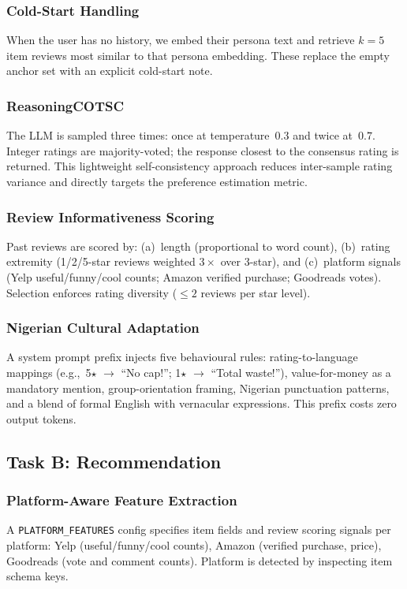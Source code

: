 \documentclass[11pt]{article}
\begin{document}
\subsubsection{Cold-Start Handling}
When the user has no history, we embed their persona text and retrieve $k=5$ item reviews most similar to that persona embedding. These replace the empty anchor set with an explicit cold-start note.

\subsubsection{ReasoningCOTSC}
The LLM is sampled three times: once at temperature~$0.3$ and twice at~$0.7$. Integer ratings are majority-voted; the response closest to the consensus rating is returned. This lightweight self-consistency approach \citep{wang2023selfconsistency} reduces inter-sample rating variance and directly targets the preference estimation metric.

\subsubsection{Review Informativeness Scoring}
Past reviews are scored by: (a)~length (proportional to word count), (b)~rating extremity (1/2/5-star reviews weighted $3\times$ over 3-star), and (c)~platform signals (Yelp useful/funny/cool counts; Amazon verified purchase; Goodreads votes). Selection enforces rating diversity ($\leq 2$ reviews per star level).

\subsubsection{Nigerian Cultural Adaptation}
A system prompt prefix injects five behavioural rules: rating-to-language mappings (e.g.,\ 5$\star$ $\to$ ``No cap!''; 1$\star$ $\to$ ``Total waste!''), value-for-money as a mandatory mention, group-orientation framing, Nigerian punctuation patterns, and a blend of formal English with vernacular expressions. This prefix costs zero output tokens.

\subsection{Task B: Recommendation}

\subsubsection{Platform-Aware Feature Extraction}
A \texttt{PLATFORM\_FEATURES} config specifies item fields and review scoring signals per platform: Yelp (useful/funny/cool counts), Amazon (verified purchase, price), Goodreads (vote and comment counts). Platform is detected by inspecting item schema keys.
\end{document}
